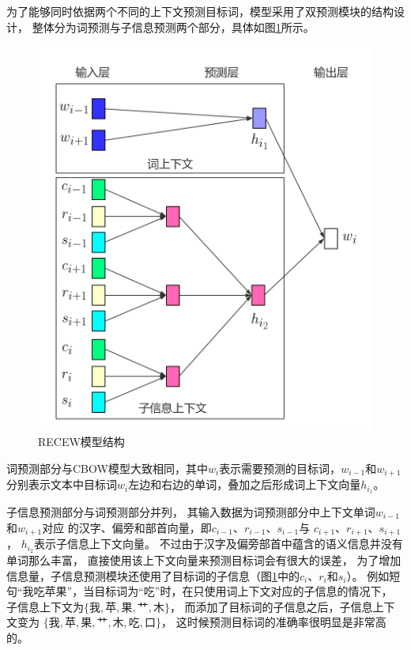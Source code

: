 \documentclass{standalone}
\begin{document}
为了能够同时依据两个不同的上下文预测目标词，模型采用了双预测模块的结构设计，
整体分为词预测与子信息预测两个部分，具体如图\ref{RECWE}所示。
\begin{figure}[h]
    \includegraphics[scale=0.4]{picture/RECWE.png}
    \caption{RECEW模型结构}
    \label{RECWE}
\end{figure}

词预测部分与CBOW模型大致相同，其中$w_i$表示需要预测的目标词，$w_{i-1}$和$w_{i+1}$
分别表示文本中目标词$w_i$左边和右边的单词，叠加之后形成词上下文向量$h_{i_1}$。

子信息预测部分与词预测部分并列，
其输入数据为词预测部分中上下文单词$w_{i-1}$和$w_{i+1}$对应
的汉字、偏旁和部首向量，即$c_{i-1}$、$r_{i-1}$、$s_{i-1}$与
$c_{i+1}$、$r_{i+1}$、$s_{i+1}$，
$h_{i_2}$表示子信息上下文向量。
不过由于汉字及偏旁部首中蕴含的语义信息并没有单词那么丰富，
直接使用该上下文向量来预测目标词会有很大的误差，
为了增加信息量，子信息预测模块还使用了目标词的子信息（图\ref{RECWE}中的$c_{i}$、$r_{i}$和$s_{i}$）。
例如短句“我吃苹果”，当目标词为“吃”时，在只使用词上下文对应的子信息的情况下，
子信息上下文为$\{\mbox{我},\mbox{苹},\mbox{果},\mbox{艹},\mbox{木}\}$，
而添加了目标词的子信息之后，子信息上下文变为
$\{\mbox{我},\mbox{苹},\mbox{果},\mbox{艹},\mbox{木},\mbox{吃},\mbox{口}\}$，
这时候预测目标词的准确率很明显是非常高的。
\end{document}
